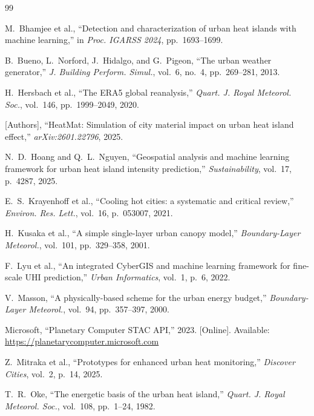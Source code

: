 \documentclass[conference]{IEEEtran}
\begin{document}

\begin{thebibliography}{99}

M.~Bhamjee et al., ``Detection and characterization of urban heat islands
with machine learning,'' in \textit{Proc. IGARSS 2024}, pp.~1693--1699.

B.~Bueno, L.~Norford, J.~Hidalgo, and G.~Pigeon, ``The urban weather
generator,'' \textit{J. Building Perform. Simul.}, vol.~6, no.~4,
pp.~269--281, 2013.

H.~Hersbach et al., ``The ERA5 global reanalysis,''
\textit{Quart. J. Royal Meteorol. Soc.}, vol.~146, pp.~1999--2049, 2020.

[Authors], ``HeatMat: Simulation of city material impact on urban heat island
effect,'' \textit{arXiv:2601.22796}, 2025.

N.~D.~Hoang and Q.~L.~Nguyen, ``Geospatial analysis and machine learning
framework for urban heat island intensity prediction,''
\textit{Sustainability}, vol.~17, p.~4287, 2025.

E.~S.~Krayenhoff et al., ``Cooling hot cities: a systematic and critical
review,'' \textit{Environ. Res. Lett.}, vol.~16, p.~053007, 2021.

H.~Kusaka et al., ``A simple single-layer urban canopy model,''
\textit{Boundary-Layer Meteorol.}, vol.~101, pp.~329--358, 2001.

F.~Lyu et al., ``An integrated CyberGIS and machine learning framework for
fine-scale UHI prediction,'' \textit{Urban Informatics}, vol.~1, p.~6, 2022.

V.~Masson, ``A physically-based scheme for the urban energy budget,''
\textit{Boundary-Layer Meteorol.}, vol.~94, pp.~357--397, 2000.

Microsoft, ``Planetary Computer STAC API,'' 2023. [Online].
Available: \url{https://planetarycomputer.microsoft.com}

Z.~Mitraka et al., ``Prototypes for enhanced urban heat monitoring,''
\textit{Discover Cities}, vol.~2, p.~14, 2025.

T.~R.~Oke, ``The energetic basis of the urban heat island,''
\textit{Quart. J. Royal Meteorol. Soc.}, vol.~108, pp.~1--24, 1982.


\end{thebibliography}
\end{document}
